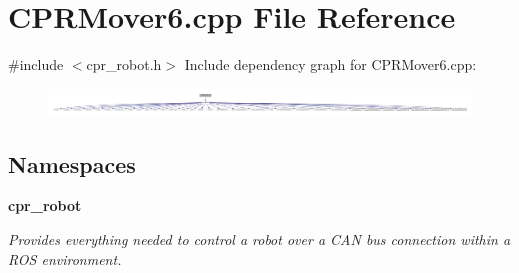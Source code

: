\section{C\+P\+R\+Mover6.\+cpp File Reference}
\label{CPRMover6_8cpp}
{\ttfamily \#include $<$cpr\+\_\+robot.\+h$>$}\newline
Include dependency graph for C\+P\+R\+Mover6.\+cpp\+:
\nopagebreak
\begin{figure}[H]
\begin{center}
\leavevmode
\includegraphics[width=350pt]{CPRMover6_8cpp__incl}
\end{center}
\end{figure}
\subsection*{Namespaces}
\begin{DoxyCompactItemize}
\item 
 \textbf{ cpr\+\_\+robot}
\begin{DoxyCompactList}\small\item\em Provides everything needed to control a robot over a C\+AN bus connection within a R\+OS environment. \end{DoxyCompactList}\end{DoxyCompactItemize}
